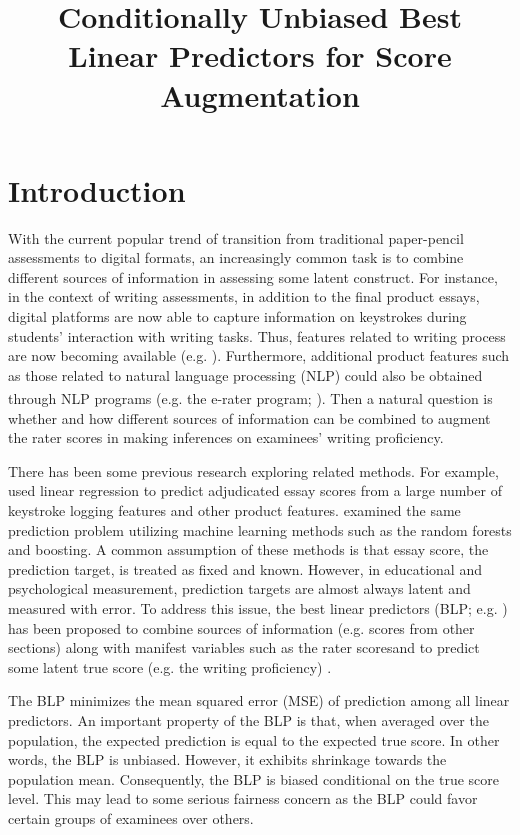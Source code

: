 \documentclass[man, floatsintext]{apa7}
\title{Conditionally Unbiased Best Linear Predictors for Score Augmentation}
\begin{document}
  \maketitle

  \section{Introduction}
	With the current popular trend of transition from traditional paper-pencil
  assessments to digital formats, an increasingly common task is to combine
  different sources of information in assessing some latent construct. For
  instance, in the context of writing assessments, in addition to the final
  product essays, digital platforms are now able to capture information on
  keystrokes during
  students' interaction with writing tasks. Thus, features related to writing
  process are now becoming available (e.g. \cite{Zhang2019,Guo2019}).
  Furthermore, additional product features such as those related to natural
  language processing (NLP) could also be obtained through NLP programs (e.g.
  the e-rater\textsuperscript{\textregistered} program; 
  \cite{Attali2006,Burstein2004}). Then a natural question is whether and how
  different sources of information can be combined to augment the rater
  scores in making inferences on examinees' writing proficiency.

  There has been some previous research exploring related methods. For example,
  \textcite{Zhang2015} used linear regression to predict adjudicated essay
  scores from a large number of keystroke logging features and other product
  features. \textcite{Sinharay2019} examined the same prediction problem
  utilizing machine learning methods such as the random forests and boosting. A
  common assumption of these methods is that essay score, the prediction
  target, is treated as fixed and known. However, in educational and
  psychological measurement, prediction targets are almost always latent and
  measured with error. To address this issue, the best linear predictors (BLP;
  e.g. \cite{Haberman2015,Yao2019}) has been proposed to combine sources of
  information (e.g. scores from other sections) along with manifest variables
  such as the rater scoresand to predict some latent true score (e.g. the
  writing proficiency) .

  The BLP minimizes the mean squared error (MSE) of prediction among all linear
  predictors. An important property of the BLP is that, when averaged over the
  population, the expected prediction is equal to the expected true score. In
  other words, the BLP is unbiased. However, it exhibits shrinkage towards
  the population mean. Consequently, the BLP is biased conditional on the true
  score level. This may lead to some serious fairness concern as the BLP could
  favor certain groups of examinees over others.
\end{document}
